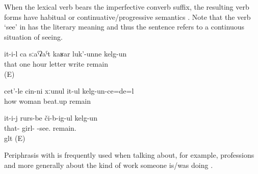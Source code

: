 When the lexical verb bears the imperfective converb suffix, the resulting verb forms have habitual or continuative\slash progressive semantics . Note that the verb `see' in  has the literary meaning and thus the sentence refers to a continuous situation of seeing.
%
\begin{exe}
	\ex	\label{ex:‎He wrote the letter in one hour}
	\gll	it-i-l	ca	sːaˁʡaˁt	kaʁar	luk'-unne	kelg-un\\
		that	one	hour	letter	write	remain\\
	\glt	{} (E)

	\ex	\label{ex:[When the man was in prison he remembered a lot], how he constantly beat up his wife}
	\gll	cet'-le	cin-ni	xːunul	it-ul	kelg-un-ce=de=l\\
		how		woman	beat.up	remain\\
	\glt	{}

	\ex	\label{‎‎He was seeing the girls.}
	\gll it-i-j	rurs-be	či-b-ig-ul	kelg-un\\
	that-	girl-	-see.	remain.\\
	glt  (E)
\end{exe}
	
Periphrasis with  is frequently used when talking about, for example, professions and more generally about the kind of work someone is/was doing .	
	
